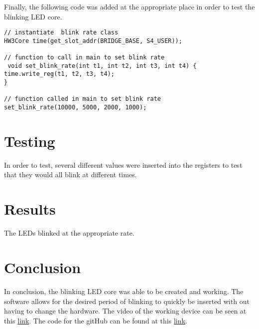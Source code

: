 \documentclass[12pt]{article}
\begin{document}
Finally, the following code was added at the appropriate place in order to test the blinking LED core.

\begin{lstlisting}
// instantiate  blink rate class
HW3Core time(get_slot_addr(BRIDGE_BASE, S4_USER));

// function to call in main to set blink rate
 void set_blink_rate(int t1, int t2, int t3, int t4) {
time.write_reg(t1, t2, t3, t4);
}

// function called in main to set blink rate
set_blink_rate(10000, 5000, 2000, 1000);
\end{lstlisting}
\section{Testing}
In order to test, several different values were inserted into the registers to test that they would all blink at different times.


\section{Results}
The LEDs blinked at the appropriate rate.

\section{Conclusion}
In conclusion, the blinking LED core was able to be created and working. The software allows for the desired period of blinking to quickly be inserted with out having to change the hardware. The video of the working device can be seen at this \href{https://www.youtube.com/watch?v=ml-7Efxw5FM}{link}. 
The code for the gitHub can be found at this \href {https://github.com/andrew-clinkenbeard/Reaction-Timer} {link}.
\end{document}
